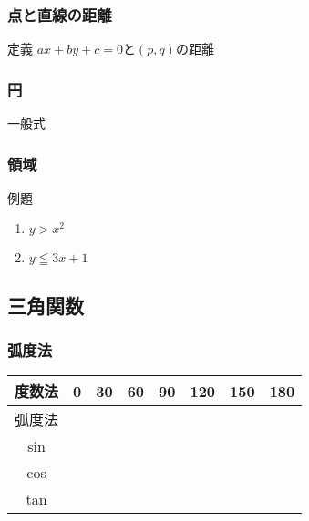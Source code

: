 \documentclass[10pt,dvipdfmx]{jsarticle}
\begin{document}
\subsubsection*{点と直線の距離}
定義 $ax+by+c=0$と$(p,q)$の距離
\vspace{10mm}

\subsubsection*{円}
一般式
\vspace{10mm}

\subsubsection*{領域}
\begin{itembox}[l]{例題}
  \begin{large}
    \begin{enumerate}
      \item $y>x^2$
      \item $y\leqq3x+1$
    \end{enumerate}
  \end{large}
\end{itembox}




\newpage
\subsection*{三角関数}
\subsubsection*{弧度法}
{\renewcommand\arraystretch{2}
  \begin{table}[H]
    \begin{tabular}{|c||p{1.5cm}|p{1.5cm}|p{1.5cm}|p{1.5cm}|p{1.5cm}|p{1.5cm}|p{1.5cm}|}
      \hline
      度数法 & 0 & 30 & 60 & 90 & 120 & 150 & 180 \\
      \hline
      弧度法 &   &    &    &    &     &     &     \\
      \hline
      sin    &   &    &    &    &     &     &     \\
      \hline
      cos    &   &    &    &    &     &     &     \\
      \hline
      tan    &   &    &    &    &     &     &     \\
      \hline
    \end{tabular}
  \end{table}
}
\end{document}
